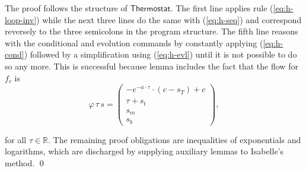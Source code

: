 \documentclass[envcountsame]{llncs}
\newcommand{\flow}{\varphi}
\newcommand{\reals}{\mathbb{R}}
\begin{document}
\begin{example}
The proof follows the structure of $\mathsf{Thermostat}$. The first line applies rule (\ref{eq:h-loop-inv}) while the next three lines do the same with (\ref{eq:h-seq}) and correspond reversely to the three semicolons in the program structure. The fifth line reasons with the conditional and evolution commands by constantly applying (\ref{eq:h-cond}) followed by a simplification using (\ref{eq:h-evl}) until it is not possible to do so any more. This is successful because lemma  includes the fact that the flow for $f_c$ is  
\begin{equation*}
\flow\, \tau\, s = 
	\begin{pmatrix}
      -e^{-a\cdot\tau}\cdot(c-s_T)+c\\
      \tau+s_t\\
	s_m\\
	s_b
    \end{pmatrix},
\end{equation*}


for all $\tau\in\reals$. The remaining proof obligations are inequalities of exponentials and logarithms, which are discharged by supplying auxiliary lemmas to Isabelle's  method. \qed
\end{example}
\end{document}
